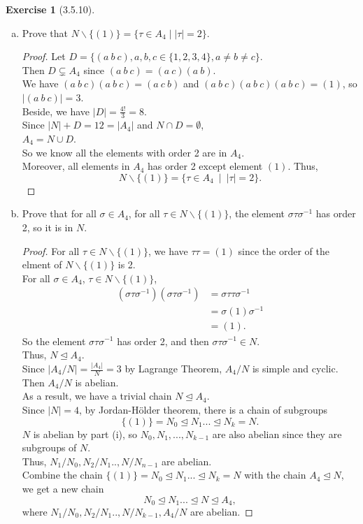 \documentclass{amsart}
\theoremstyle{plain}
\theoremstyle{definition}
\newtheorem{exer}[lem]{Exercise}
\begin{document}
\begin{exer}[3.5.10]
\begin{enumerate}[(a)]
\item 
Prove that $N\smallsetminus\{(1)\}=\{\tau\in A_4\mid|\tau|=2\}$.
\begin{proof}
  Let $D = \{(a~b~c),a,b,c \in \{1,2,3,4\}, a\neq b\neq c\}$. \\
  Then $D \subsetneq A_4$ since $(a~b~c) = (a~c)(a~b)$.\\
  We have $(a~b~c)(a~b~c) = (a~c~b)$ and $(a~b~c)(a~b~c)(a~b~c) = (1)$, so $|(a~b~c)| = 3$. \\
  Beside, we have $|D| = \frac{4!}{3} = 8$. \\
  Since $|N| + D = 12 = |A_4|$ and $N \cap D = \emptyset $,\\
  $A_4 = N \cup D$.\\
  So we know all the elements with order 2 are in $A_4$. \\
  Moreover, all elements in $A_4$ has order 2 except element $(1)$.
  Thus,
  \[ N \smallsetminus \{(1)\} = \{\tau \in A_4~\mid~ |\tau| = 2\} .  \] 

\end{proof}

\item 
Prove that for all $\sigma\in A_4$, for all $\tau\in N\smallsetminus\{(1)\}$, the element $\sigma\tau\sigma^{-1}$ has order 2, so it is in $N$. 

\begin{proof}
  For all $\tau\in N\smallsetminus\{(1)\}$, we have $\tau \tau = (1)$ since the order of the elment of $N\smallsetminus\{(1)\}$ is 2.\\
  For all $\sigma\in A_4$, $\tau\in N\smallsetminus\{(1)\}$,
  \begin{align*}
  	(\sigma\tau\sigma^{-1})(\sigma\tau\sigma^{-1}) &= \sigma\tau\tau\sigma^{-1} \\
  												   &= \sigma(1)\sigma^{-1} \\
  												   &= (1).
  \end{align*}
  	So the element $\sigma\tau\sigma^{-1}$ has order 2, and then $\sigma\tau\sigma^{-1} \in N$.\\
  	Thus, $N\unlhd A_4$.\\
	Since $|A_4/N| = \frac{|A_4|}{N} = 3$ by Lagrange Theorem, $A_4/N$ is simple and cyclic.\\
	Then $A_4/N$ is abelian.\\
	As a result, we have a trivial chain $N \unlhd A_4$.\\
  	Since $|N| = 4$, by Jordan-H\"older theorem, there is a chain of subgroups 
  	\[ \{(1)\} = N_0 \unlhd N_1...\unlhd N_k = N.\] 
  	$N$ is abelian by part (i), so $N_0,N_1, ..., N_{k-1}$ are also abelian since they are subgroups of $N$.\\ 
  	Thus, $N_1/N_0,N_2/N_1..,N/N_{n-1}$ are abelian.\\
	Combine the chain $\{(1)\} = N_0 \unlhd N_1...\unlhd N_k = N$ with the chain $A_4 \unlhd N$,\\
	we get a new chain
	\[  N_0 \unlhd N_1...\unlhd  N \unlhd A_4,\]
	where $N_1/N_0, N_2/N_1..,N/N_{k-1}, A_4/N$ are abelian.
 \end{proof}
  	

\end{enumerate}
\end{exer}
\end{document}
